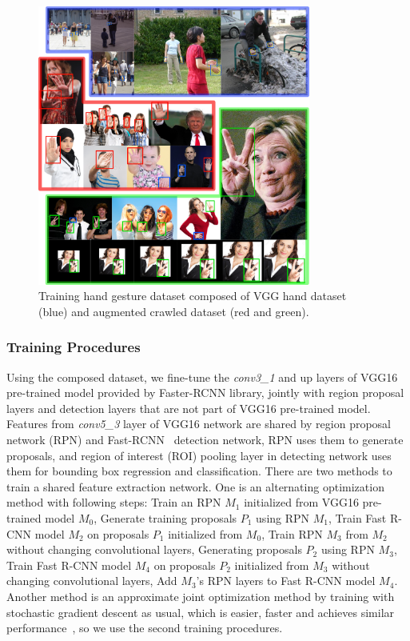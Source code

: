 \begin{figure}[!htbp]
    \centering
    \includegraphics[width=0.8\textwidth]{figure/ch4-gesturedataset.png}
    \caption{Training hand gesture dataset composed of VGG hand dataset (blue) and augmented crawled dataset (red and green).}
    \label{fig:ch4-gesturedataset}
\end{figure}

\subsubsection{Training Procedures}
Using the composed dataset, we fine-tune the \emph{conv3\_1} and up layers of VGG16 pre-trained model provided by Faster-RCNN library, jointly with region proposal layers and detection layers that are not part of VGG16 pre-trained model. Features from \emph{conv5\_3} layer of VGG16 network are shared by region proposal network (RPN) and Fast-RCNN~\cite{girshick2015fast} detection network, RPN uses them to generate proposals, and region of interest (ROI) pooling layer in detecting network uses them for bounding box regression and classification. There are two methods to train a shared feature extraction network. One is an alternating optimization method with following steps:  Train an RPN $M_1$ initialized from VGG16 pre-trained model $M_0$,  Generate training proposals $P_1$ using RPN $M_1$,  Train Fast R-CNN model $M_2$ on proposals $P_1$ initialized from $M_0$,  Train RPN $M_3$ from $M_2$ without changing convolutional layers,  Generating proposals $P_2$ using RPN $M_3$,  Train Fast R-CNN model $M_4$ on proposals $P_2$ initialized from $M_3$ without changing convolutional layers,  Add $M_3$'s RPN layers to Fast R-CNN model $M_4$. Another method is an approximate joint optimization method by training with stochastic gradient descent as usual, which is easier, faster and achieves similar performance~\cite{links:pyfasterrcnn}, so we use the second training procedures.

